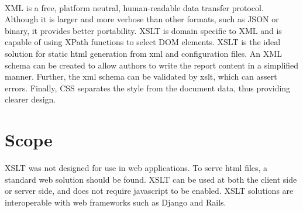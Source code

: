 \documentclass{article}
\begin{document}
\\
XML is a free, platform neutral, human-readable data transfer protocol.  Although it is larger and more verbose than other formats, such as JSON or binary, it provides better portability.  XSLT is domain specific to XML and is capable of using XPath functions to select DOM elements.  XSLT is the ideal solution for static html generation from xml and configuration files.  An XML schema can be created to allow authors to write the report content in a simplified manner.  Further, the xml schema can be validated by xslt, which can assert errors.  Finally, CSS separates the style from the document data, thus providing clearer design.   



%
%


%
\section*{Scope}
XSLT was not designed for use in web applications.  To serve html files, a standard web solution should be found.  XSLT can be used at both the client side or server side, and does not require javascript to be enabled.  XSLT solutions are interoperable with web frameworks such as Django and Rails. 
\end{document}
